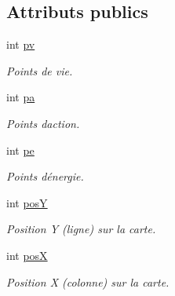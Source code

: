 \subsection*{Attributs publics}
\begin{DoxyCompactItemize}
\item 
\mbox{\label{structperso__t_a3f11a75ec934e0df24f4cac92ce2bd72}} 
int \hyperlink{structperso__t_a3f11a75ec934e0df24f4cac92ce2bd72}{pv}
\begin{DoxyCompactList}\small\item\em Points de vie. \end{DoxyCompactList}\item 
\mbox{\label{structperso__t_a07ccf45424cfd47a3199941889a4d71f}} 
int \hyperlink{structperso__t_a07ccf45424cfd47a3199941889a4d71f}{pa}
\begin{DoxyCompactList}\small\item\em Points d\textquotesingle{}action. \end{DoxyCompactList}\item 
\mbox{\label{structperso__t_af4874d4995aa7375d024428e2dbb78e7}} 
int \hyperlink{structperso__t_af4874d4995aa7375d024428e2dbb78e7}{pe}
\begin{DoxyCompactList}\small\item\em Points d\textquotesingle{}énergie. \end{DoxyCompactList}\item 
\mbox{\label{structperso__t_ab6ac3f0a4b6382b801e248270db55739}} 
int \hyperlink{structperso__t_ab6ac3f0a4b6382b801e248270db55739}{posY}
\begin{DoxyCompactList}\small\item\em Position Y (ligne) sur la carte. \end{DoxyCompactList}\item 
\mbox{\label{structperso__t_a844ca5ae82e0a65ee2fc268a23352b7a}} 
int \hyperlink{structperso__t_a844ca5ae82e0a65ee2fc268a23352b7a}{posX}
\begin{DoxyCompactList}\small\item\em Position X (colonne) sur la carte. \end{DoxyCompactList}\item 
\mbox{\label{structperso__t_a6d298fd23c478b7276afd67adaaa78e2}} 

\end{DoxyCompactItemize}
